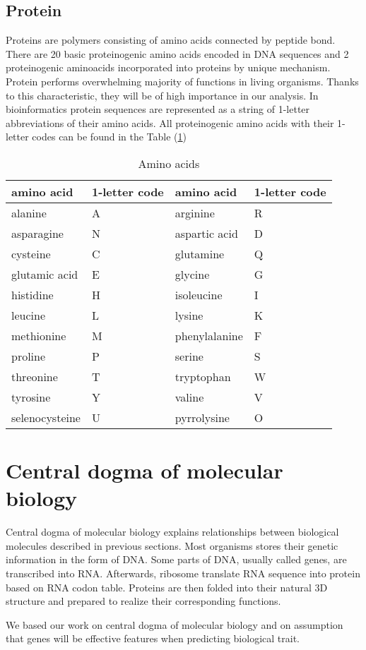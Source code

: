 \subsection{Protein}
Proteins are polymers consisting of amino acids connected by peptide bond.
There are 20 basic proteinogenic amino acids encoded in DNA sequences and 2 proteinogenic aminoacids incorporated into proteins by unique mechanism.
Protein performs overwhelming majority of functions in living organisms.
Thanks to this characteristic, they will be of high importance in our analysis.
In bioinformatics protein sequences are represented as a string of 1-letter abbreviations of their amino acids. All proteinogenic amino acids with their 1-letter codes can be found in the Table (\ref{tab:amino})

\begin{table}
  \centering
    \begin{tabular}{ l  l  l  l }
      \hline
      amino acid & 1-letter code & amino acid & 1-letter code \\
      \hline  
      alanine & A & arginine & R \\
      asparagine & N & aspartic acid & D \\
      cysteine & C & glutamine & Q \\
      glutamic acid & E & glycine & G \\
      histidine & H & isoleucine & I \\
      leucine & L & lysine & K \\
      methionine & M & phenylalanine & F \\
      proline & P & serine & S \\
      threonine & T & tryptophan & W \\
      tyrosine & Y & valine & V \\
      selenocysteine & U & pyrrolysine & O \\
      \hline
    \end{tabular}
    \caption{Amino acids}
    \label{tab:amino}
\end{table}
 


\section{Central dogma of molecular biology}
Central dogma of molecular biology explains relationships between biological molecules described in previous sections.
Most organisms stores their genetic information in the form of DNA.
Some parts of DNA, usually called genes, are transcribed into RNA.
Afterwards, ribosome translate RNA sequence into protein based on RNA codon table.
Proteins are then folded into their natural 3D structure and prepared to realize their corresponding functions.

We based our work on central dogma of molecular biology and on assumption that genes will be effective features when predicting biological trait.




